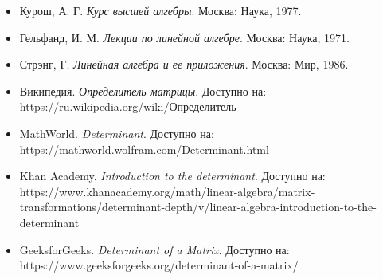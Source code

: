 \begin{itemize}
	\item Курош, А. Г. \textit{Курс высшей алгебры}. Москва: Наука, 1977.
	\item Гельфанд, И. М. \textit{Лекции по линейной алгебре}. Москва: Наука, 1971.
	\item Стрэнг, Г. \textit{Линейная алгебра и ее приложения}. Москва: Мир, 1986.
	\item Википедия. \textit{Определитель матрицы}. Доступно на: https://ru.wikipedia.org/wiki/Определитель
	\item MathWorld. \textit{Determinant}. Доступно на: https://mathworld.wolfram.com/Determinant.html
	\item Khan Academy. \textit{Introduction to the determinant}. Доступно на: https://www.khanacademy.org/math/linear-algebra/matrix-transformations/determinant-depth/v/linear-algebra-introduction-to-the-determinant
	\item GeeksforGeeks. \textit{Determinant of a Matrix}. Доступно на: https://www.geeksforgeeks.org/determinant-of-a-matrix/
	
\end{itemize}
